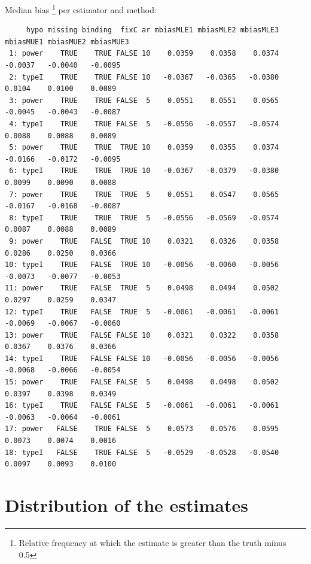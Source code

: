 \documentclass[12pt]{article}
\begin{document}
Median bias \footnote{Relative frequency at which the estimate is greater than the truth minus 0.5} per estimator and method:
\begin{adjustwidth}{-1cm}{-1cm}
\begin{verbatim}
     hypo missing binding  fixC ar mbiasMLE1 mbiasMLE2 mbiasMLE3 mbiasMUE1 mbiasMUE2 mbiasMUE3
 1: power    TRUE    TRUE FALSE 10    0.0359    0.0358    0.0374   -0.0037   -0.0040   -0.0095
 2: typeI    TRUE    TRUE FALSE 10   -0.0367   -0.0365   -0.0380    0.0104    0.0100    0.0089
 3: power    TRUE    TRUE FALSE  5    0.0551    0.0551    0.0565   -0.0045   -0.0043   -0.0087
 4: typeI    TRUE    TRUE FALSE  5   -0.0556   -0.0557   -0.0574    0.0088    0.0088    0.0089
 5: power    TRUE    TRUE  TRUE 10    0.0359    0.0355    0.0374   -0.0166   -0.0172   -0.0095
 6: typeI    TRUE    TRUE  TRUE 10   -0.0367   -0.0379   -0.0380    0.0099    0.0090    0.0088
 7: power    TRUE    TRUE  TRUE  5    0.0551    0.0547    0.0565   -0.0167   -0.0168   -0.0087
 8: typeI    TRUE    TRUE  TRUE  5   -0.0556   -0.0569   -0.0574    0.0087    0.0088    0.0089
 9: power    TRUE   FALSE  TRUE 10    0.0321    0.0326    0.0358    0.0286    0.0250    0.0366
10: typeI    TRUE   FALSE  TRUE 10   -0.0056   -0.0060   -0.0056   -0.0073   -0.0077   -0.0053
11: power    TRUE   FALSE  TRUE  5    0.0498    0.0494    0.0502    0.0297    0.0259    0.0347
12: typeI    TRUE   FALSE  TRUE  5   -0.0061   -0.0061   -0.0061   -0.0069   -0.0067   -0.0060
13: power    TRUE   FALSE FALSE 10    0.0321    0.0322    0.0358    0.0367    0.0376    0.0366
14: typeI    TRUE   FALSE FALSE 10   -0.0056   -0.0056   -0.0056   -0.0068   -0.0066   -0.0054
15: power    TRUE   FALSE FALSE  5    0.0498    0.0498    0.0502    0.0397    0.0398    0.0349
16: typeI    TRUE   FALSE FALSE  5   -0.0061   -0.0061   -0.0061   -0.0063   -0.0064   -0.0061
17: power   FALSE    TRUE FALSE  5    0.0573    0.0576    0.0595    0.0073    0.0074    0.0016
18: typeI   FALSE    TRUE FALSE  5   -0.0529   -0.0528   -0.0540    0.0097    0.0093    0.0100
\end{verbatim}

\end{adjustwidth}

\clearpage

\section{Distribution of the estimates}
\label{sec:org0f693bd}
\end{document}
